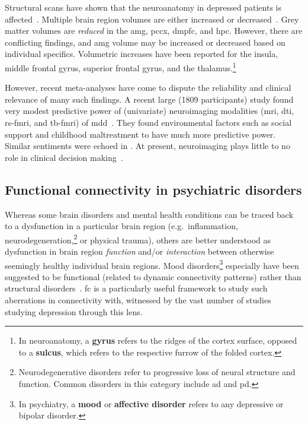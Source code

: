 Structural scans have shown that the neuroanatomy in depressed patients is affected~\parencite{Drevets2000}.
Multiple brain region volumes are either increased or decreased~\parencite{Sacher2012, Schmaal2020}.
Grey matter volumes are \emph{reduced} in the \gls{amg}, \gls{pccx}, \gls{dmpfc}, and \gls{hpc}.
However, there are conflicting findings, and \gls{amg} volume may be increased or decreased based on individual specifics.
Volumetric increases have been reported for the insula, middle frontal gyrus, superior frontal gyrus, and the thalamus.\footnote{In neuroanatomy, a \textbf{gyrus} refers to the ridges of the cortex surface, opposed to a \textbf{sulcus}, which refers to the respective furrow of the folded cortex.}

However, recent meta-analyses have come to dispute the reliability and clinical relevance of many such findings.
A recent large (1809 participants) study found very modest predictive power of (univariate) neuroimaging modalities (\gls{mri}, \gls{dti}, \gls{rs-fmri}, and \gls{tb-fmri}) of \gls{mdd}~\parencite{Winter2022}.
They found environmental factors such as social support and childhood maltreatment to have much more predictive power.
Similar sentiments were echoed in \textcite{Nour2022}.
At present, neuroimaging plays little to no role in clinical decision making~\parencite{Kapur2012}.

\subsection{Functional connectivity in psychiatric disorders}\label{subsec:fc-depression}

Whereas some brain disorders and mental health conditions can be traced back to a dysfunction in a particular brain region (e.g.~inflammation, neurodegeneration,\footnote{Neurodegenerative disorders refer to progressive loss of neural structure and function. Common disorders in this category include \gls{ad} and \gls{pd}.} or physical trauma), others are better understood as dysfunction in brain region \emph{function} and/or \emph{interaction} between otherwise seemingly healthy individual brain regions.
Mood disorders\footnote{In psychiatry, a \textbf{mood} or \textbf{affective disorder} refers to any depressive or bipolar disorder.} especially have been suggested to be functional (related to dynamic connectivity patterns) rather than structural disorders~\parencite{Piguet2021}.
\Gls{fc} is a particularly useful framework to study such aberrations in connectivity with, witnessed by the vast number of studies studying depression through this lens.

